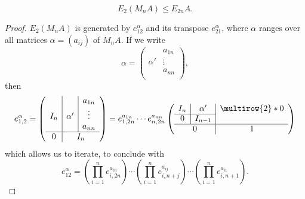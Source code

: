 \begin{equation}
  E_2(M_nA)\leqslant E_{2n}A.
\end{equation}

\begin{proof}
$E_2(M_nA)$ is generated by $e_{12}^\alpha$ and its transpose $e_{21}^\alpha$, where $\alpha$ ranges over all matrices
$\alpha=(a_{ij})$ of $M_nA$. If we write
\[\alpha=\left(
\begin{array}{c|c}
 & a_{1n}\\
\alpha' &\vdots\\
& a_{nn}\\
\end{array}\right), \]
then
\[e_{1,2}^{\alpha}=\left(
\begin{array}{c|c|c}
 & & a_{1n}\\
I_n& \alpha' &\vdots\\
& & a_{nn}\\
\hline
0& \multicolumn{2}{c}{I_n}
\end{array}\right)=e_{1,2n}^{a_{1n}}\cdots e_{n,2n}^{a_{nn}}\left(
\begin{array}{c|c|c}
I_n & \alpha'& \multirow{2}*{0}\\
\cline{1-2}
0&I_{n-1} & \\
\hline
\multicolumn{2}{c|}{0}& 1\\
\end{array}\right) \]
which allows us to iterate, to conclude with
\[e_{12}^{\alpha}=(\prod_{i=1}^n e_{i,2n}^{a_{in}})\cdots(\prod_{i=1}^n e_{i,n+j}^{a_{ij}})\cdots(\prod_{i=1}^n e_{i,n+1}^{a_{i1}}).\]
\end{proof}

